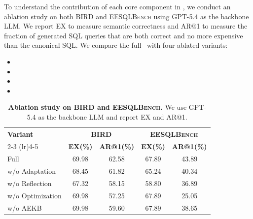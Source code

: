 To understand the contribution of each core component in \toolname, we conduct an ablation study on both \textsc{BIRD} and \textsc{EESQLBench} using GPT-5.4 as the backbone LLM.
We report EX to measure semantic correctness and AR@1 to measure the fraction of generated SQL queries that are both correct and no more expensive than the canonical SQL.
We compare the full \toolname\ with four ablated variants:

\begin{itemize}[leftmargin=10pt]
	\item {}
	\item {}
	\item {}
	\item {}
\end{itemize}

\begin{table}[t]
	\centering
	\caption{\textbf{Ablation study on \textsc{BIRD} and \textsc{EESQLBench}.}
		We use \textsc{GPT-5.4} as the backbone LLM and report EX and AR@1.}
	\vspace{-3mm}
	\label{tab}
	\footnotesize
	\setlength{\tabcolsep}{5.8pt}
	\renewcommand{\arraystretch}{0.95}
	\begin{tabular}{lcccc}
		\toprule
		\multirow{2}{*}{\textbf{Variant}}
		& \multicolumn{2}{c}{\textbf{\textsc{BIRD}}}
		& \multicolumn{2}{c}{\textbf{\textsc{EESQLBench}}} \\
		\cmidrule(lr){2-3}
		\cmidrule(lr){4-5}
		& \textbf{EX(\%)} & \textbf{AR@1(\%)}
		& \textbf{EX(\%)} & \textbf{AR@1(\%)} \\
		\midrule
		Full & 69.98 & 62.58 & 67.89 & 43.89 \\
		w/o Adaptation & 68.45 & 61.82 & 65.24 & 40.34 \\
		w/o Reflection & 67.32 & 58.15 & 58.80 & 36.89 \\
		w/o Optimization & 69.98 & 57.25 & 67.89 & 25.05 \\
		w/o AEKB & 69.98 & 59.60 & 67.89 & 38.65 \\
		\bottomrule
	\end{tabular}
	\vspace{-4mm}
\end{table}

